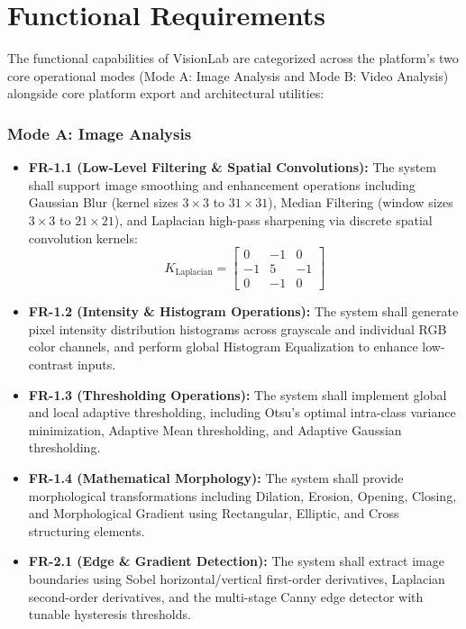 \section{Functional Requirements}

The functional capabilities of VisionLab are categorized across the platform's two core operational modes (Mode A: Image Analysis and Mode B: Video Analysis) alongside core platform export and architectural utilities:

\subsubsection{Mode A: Image Analysis}
\begin{itemize}
    \item \textbf{FR-1.1 (Low-Level Filtering \& Spatial Convolutions):} The system shall support image smoothing and enhancement operations including Gaussian Blur (kernel sizes $3\times3$ to $31\times31$), Median Filtering (window sizes $3\times3$ to $21\times21$), and Laplacian high-pass sharpening via discrete spatial convolution kernels:
    \begin{equation}
        K_{\text{Laplacian}} = \begin{bmatrix} 0 & -1 & 0 \\ -1 & 5 & -1 \\ 0 & -1 & 0 \end{bmatrix}
    \end{equation}
    \item \textbf{FR-1.2 (Intensity \& Histogram Operations):} The system shall generate pixel intensity distribution histograms across grayscale and individual RGB color channels, and perform global Histogram Equalization to enhance low-contrast inputs.
    \item \textbf{FR-1.3 (Thresholding Operations):} The system shall implement global and local adaptive thresholding, including Otsu's optimal intra-class variance minimization, Adaptive Mean thresholding, and Adaptive Gaussian thresholding.
    \item \textbf{FR-1.4 (Mathematical Morphology):} The system shall provide morphological transformations including Dilation, Erosion, Opening, Closing, and Morphological Gradient using Rectangular, Elliptic, and Cross structuring elements.
    \item \textbf{FR-2.1 (Edge \& Gradient Detection):} The system shall extract image boundaries using Sobel horizontal/vertical first-order derivatives, Laplacian second-order derivatives, and the multi-stage Canny edge detector with tunable hysteresis thresholds.

\end{itemize}
